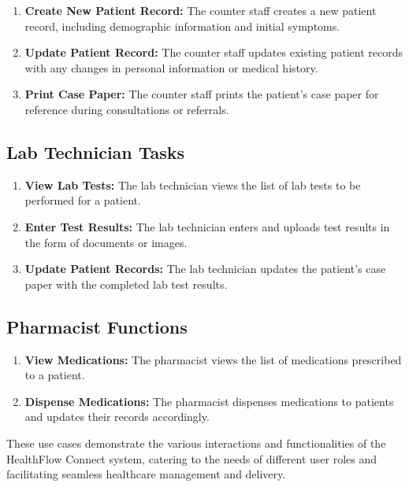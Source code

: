 \begin{enumerate}[label=\textbf{UC\arabic*.}]
  \item \textbf{Create New Patient Record:} The counter staff creates a new patient record, including demographic information and initial symptoms.
  
  \item \textbf{Update Patient Record:} The counter staff updates existing patient records with any changes in personal information or medical history.
  
  \item \textbf{Print Case Paper:} The counter staff prints the patient's case paper for reference during consultations or referrals.
\end{enumerate}

\subsection{Lab Technician Tasks}

\begin{enumerate}[label=\textbf{UC\arabic*.}]
  \item \textbf{View Lab Tests:} The lab technician views the list of lab tests to be performed for a patient.
  
  \item \textbf{Enter Test Results:} The lab technician enters and uploads test results in the form of documents or images.
  
  \item \textbf{Update Patient Records:} The lab technician updates the patient's case paper with the completed lab test results.
\end{enumerate}

\subsection{Pharmacist Functions}

\begin{enumerate}[label=\textbf{UC\arabic*.}]
  \item \textbf{View Medications:} The pharmacist views the list of medications prescribed to a patient.
  
  \item \textbf{Dispense Medications:} The pharmacist dispenses medications to patients and updates their records accordingly.
\end{enumerate}

These use cases demonstrate the various interactions and functionalities of the HealthFlow Connect system, catering to the needs of different user roles and facilitating seamless healthcare management and delivery.

